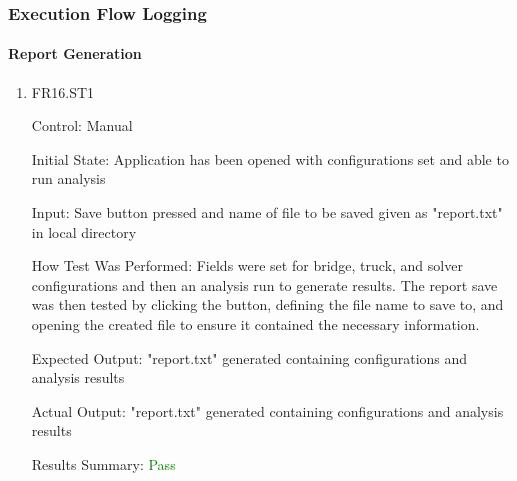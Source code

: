 \documentclass[12pt, titlepage]{article}
\begin{document}
\subsubsection{Execution Flow Logging}

\paragraph{Report Generation}

\begin{enumerate}

\item{FR16.ST1\\}

Control: Manual
					
Initial State: Application has been opened with configurations set and able to run analysis
					
Input: Save button pressed and name of file to be saved given as "report.txt" in local directory

How Test Was Performed: Fields were set for bridge, truck, and solver configurations and then an analysis run to generate results. The report save was then tested by clicking the button, defining the file name to save to, and opening the created file to ensure it contained the necessary information.
					
Expected Output: "report.txt" generated containing configurations and analysis results

Actual Output: "report.txt" generated containing configurations and analysis results

Results Summary: \textcolor{green} {Pass}
					
\end{enumerate}
\end{document}
